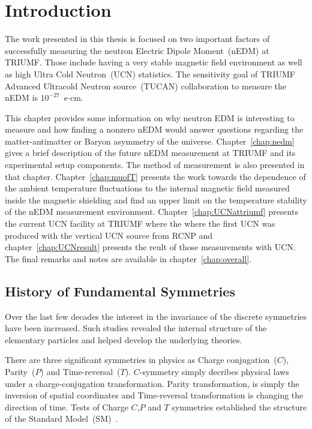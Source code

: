 \chapter{Introduction\label{chap:intro}}
\renewcommand{\thepage}{\arabic{page}}%
\setcounter{page}{1}%



The work presented in this thesis is focused on two important factors
of successfully measuring the neutron Electric Dipole Moment~(nEDM) at
TRIUMF. Those include having a very stable magnetic field environment
as well as high Ultra Cold Neutron~(UCN) statistics. The sensitivity
goal of TRIUMF Advanced Ultracold Neutron source~(TUCAN) collaboration
to measure the nEDM is $10^{-27}$~e$\cdot$cm.


This chapter provides some information on why neutron EDM is
interesting to measure and how finding a nonzero nEDM would answer
questions regarding the matter-antimatter or Baryon asymmetry of the
universe. Chapter~\ref{chap:nedm} gives a brief description of the
future nEDM measurement at TRIUMF and its experimental setup
components. The method of measurement is also presented in that
chapter. Chapter~\ref{chap:muofT} presents the work towards the
dependence of the ambient temperature fluctuations to the internal
magnetic field measured inside the magnetic shielding and find an
upper limit on the temperature stability of the nEDM measurement
environment. Chapter~\ref{chap:UCNattriumf} presents the current UCN
facility at TRIUMF where the where the first UCN was produced with the
vertical UCN source from RCNP and chapter~\ref{chap:UCNresult}
presents the reult of those measurements with UCN. The final remarks
and notes are available in chapter~\ref{chap:overall}.



\section{History of Fundamental Symmetries }

Over the last few decades the interest in the invariance of the
discrete symmetries have been increased. Such studies revealed the
internal structure of the elementary particles and helped develop the
underlying theories.

There are three significant symmetries in physics as Charge
conjugation~($C$), Parity~($P$) and Time-reversal~($T$). $C$-symmetry
simply decribes physical laws under a charge-conjugation
transformation. Parity transformation, is simply the inversion of
spatial coordinates and Time-reversal transformation is changing the
direction of time.  Tests of Charge $C$,$P$ and $T$ symmetries
established the structure
of the Standard Model~(SM)~\cite{pospelov2005electric}.

